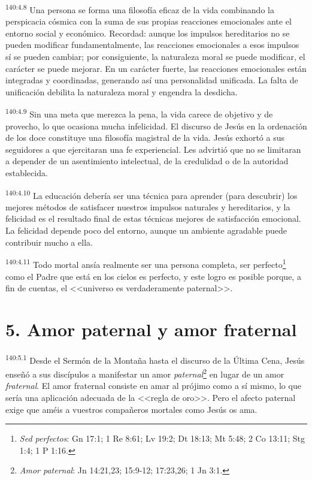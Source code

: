 \par 
\textsuperscript{140:4.8} Una persona se forma una filosofía eficaz de la vida combinando la perspicacia cósmica con la suma de sus propias reacciones emocionales ante el entorno social y económico. Recordad: aunque los impulsos hereditarios no se pueden modificar fundamentalmente, las reacciones emocionales a esos impulsos sí se pueden cambiar; por consiguiente, la naturaleza moral se puede modificar, el carácter se puede mejorar. En un carácter fuerte, las reacciones emocionales están integradas y coordinadas, generando así una personalidad unificada. La falta de unificación debilita la naturaleza moral y engendra la desdicha.

\par 
\textsuperscript{140:4.9} Sin una meta que merezca la pena, la vida carece de objetivo y de provecho, lo que ocasiona mucha infelicidad. El discurso de Jesús en la ordenación de los doce constituye una filosofía magistral de la vida. Jesús exhortó a sus seguidores a que ejercitaran una fe experiencial. Les advirtió que no se limitaran a depender de un asentimiento intelectual, de la credulidad o de la autoridad establecida.

\par 
\textsuperscript{140:4.10} La educación debería ser una técnica para aprender (para descubrir) los mejores métodos de satisfacer nuestros impulsos naturales y hereditarios, y la felicidad es el resultado final de estas técnicas mejores de satisfacción emocional. La felicidad depende poco del entorno, aunque un ambiente agradable puede contribuir mucho a ella.

\par 
\textsuperscript{140:4.11} Todo mortal ansía realmente ser una persona completa, ser perfecto\footnote{\textit{Sed perfectos}: Gn 17:1; 1 Re 8:61; Lv 19:2; Dt 18:13; Mt 5:48; 2 Co 13:11; Stg 1:4; 1 P 1:16.} como el Padre que está en los cielos es perfecto, y este logro es posible porque, a fin de cuentas, el <<universo es verdaderamente paternal>>.

\section*{5. Amor paternal y amor fraternal}
\par 
\textsuperscript{140:5.1} Desde el Sermón de la Montaña hasta el discurso de la
Última Cena, Jesús enseñó a sus discípulos a manifestar un amor \textit{paternal}\footnote{\textit{Amor paternal}: Jn 14:21,23; 15:9-12; 17:23,26; 1 Jn 3:1.} en lugar de un amor \textit{fraternal}. El amor fraternal consiste en amar al prójimo como a sí mismo, lo que sería una aplicación adecuada de la <<regla de oro>>. Pero el afecto paternal exige que améis a vuestros compañeros mortales como Jesús os ama.

